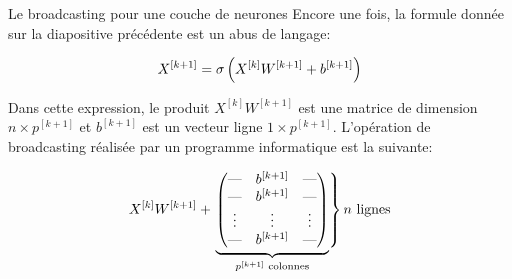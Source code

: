 \begin{frame}{Le broadcasting pour une couche de neurones}
	Encore une fois, la formule donnée sur la diapositive précédente est un abus de langage:
	
	\begin{equation*}
		X^{[k+1]} = \operatorname{\sigma}\left(X^{[k]} W^{[k+1]} + b^{[k+1]}\right)
	\end{equation*}
	
	Dans cette expression, le produit $X^{[k]} W^{[k+1]}$ est une matrice de dimension $n \times p^{[k+1]}$ et $b^{[k+1]}$ est un vecteur ligne $1 \times p^{[k+1]}$. L'opération de broadcasting réalisée par un programme informatique est la suivante:
	
	\begin{equation*}
		X^{[k]} W^{[k+1]} + \left.
		\smash[b]{\underbrace{
				\begin{pmatrix}
					\text{---} & b^{[k+1]} & \text{---} \\
					\text{---} & b^{[k+1]} & \text{---} \\
					\vdots & \vdots & \vdots \\
					\text{---} & b^{[k+1]} & \text{---}
				\end{pmatrix}
			}_{p^{[k+1]} \text{ colonnes}}}
		\right\} n \text{ lignes}
		\vphantom{\underbrace{\begin{matrix} \\ \\ \\ \end{matrix}}_{p^{[k]} \text{ colonnes}}}
	\end{equation*}
	
\end{frame}

